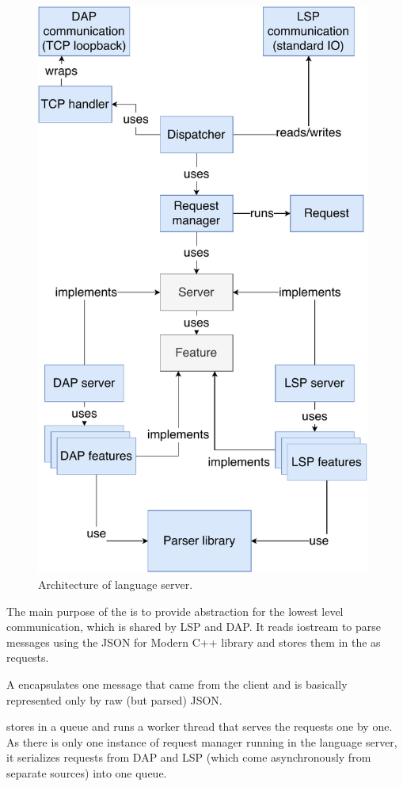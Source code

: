 \begin{figure}
	\centering
	\includegraphics[width=11cm]{img/lang_server}
	\caption{Architecture of language server.}
	\label{lang_server_arch}
\end{figure}


The main purpose of the  is to provide abstraction for the lowest level communication, which is shared by LSP and DAP. It reads iostream to parse messages using the JSON for Modern C++ library and stores them in the  as requests.

A  encapsulates one message that came from the client and is basically represented only by raw (but parsed) JSON.

 stores  in a queue and runs a worker thread that serves the requests one by one. As there is only one instance of request manager running in the language server, it serializes requests from DAP and LSP (which come asynchronously from separate sources) into one queue.

